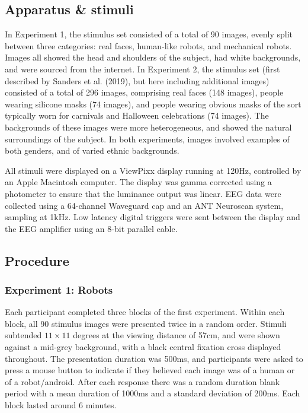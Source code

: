 \documentclass[
]{article}
\begin{document}
\subsection{Apparatus \& stimuli}\label{apparatus-stimuli}

In Experiment 1, the stimulus set consisted of a total of 90 images, evenly split between three categories: real faces, human-like robots, and mechanical robots. Images all showed the head and shoulders of the subject, had white backgrounds, and were sourced from the internet. In Experiment 2, the stimulus set (first described by Sanders et al. (2019), but here including additional images) consisted of a total of 296 images, comprising real faces (148 images), people wearing silicone masks (74 images), and people wearing obvious masks of the sort typically worn for carnivals and Halloween celebrations (74 images). The backgrounds of these images were more heterogeneous, and showed the natural surroundings of the subject. In both experiments, images involved examples of both genders, and of varied ethnic backgrounds.

All stimuli were displayed on a ViewPixx display running at 120Hz, controlled by an Apple Macintosh computer. The display was gamma corrected using a photometer to ensure that the luminance output was linear. EEG data were collected using a 64-channel Waveguard cap and an ANT Neuroscan system, sampling at 1kHz. Low latency digital triggers were sent between the display and the EEG amplifier using an 8-bit parallel cable.

\subsection{Procedure}\label{procedure}

\subsubsection{Experiment 1: Robots}\label{experiment-1-robots}

Each participant completed three blocks of the first experiment. Within each block, all 90 stimulus images were presented twice in a random order. Stimuli subtended \(11\times11\) degrees at the viewing distance of 57cm, and were shown against a mid-grey background, with a black central fixation cross displayed throughout. The presentation duration was 500ms, and participants were asked to press a mouse button to indicate if they believed each image was of a human or of a robot/android. After each response there was a random duration blank period with a mean duration of 1000ms and a standard deviation of 200ms. Each block lasted around 6 minutes.
\end{document}
